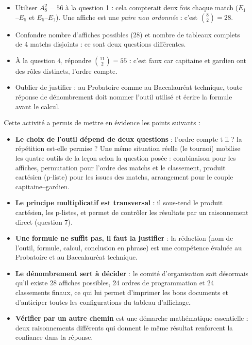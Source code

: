 \documentclass[11pt]{article}
\newcounter{popsec}
\newcounter{popsub}
\newcommand{\courssub}[1]{%
  \stepcounter{popsub}%
  \par\vspace{9pt}\noindent{\popxbold\fontsize{11.5}{13}\selectfont\color{popink}{\color{poporange}\thepopsec.\thepopsub}\hspace{6pt}#1}\par\nopagebreak\vspace{4pt}
}
\begin{document}
\begin{attention}
\begin{itemize}
\item Utiliser $A_8^2 = 56$ à la question 1 : cela compterait deux fois chaque match ($E_1$--$E_5$ et $E_5$--$E_1$). Une affiche est une \emph{paire non ordonnée} : c'est $\binom{8}{2} = 28$.
\item Confondre \og nombre d'affiches possibles \fg{} (28) et \og nombre de tableaux complets de 4 matchs disjoints \fg : ce sont deux questions différentes.
\item À la question 4, répondre $\binom{11}{2} = 55$ : c'est faux car capitaine et gardien ont des rôles distincts, l'ordre compte.
\item Oublier de justifier : au Probatoire comme au Baccalauréat technique, toute réponse de dénombrement doit nommer l'outil utilisé et écrire la formule avant le calcul.
\end{itemize}
\end{attention}

\courssub{Bilan de l'activité}

Cette activité a permis de mettre en évidence les points suivants :
\begin{itemize}
\item \textbf{Le choix de l'outil dépend de deux questions} : l'ordre compte-t-il ? la répétition est-elle permise ? Une même situation réelle (le tournoi) mobilise les quatre outils de la leçon selon la question posée : combinaison pour les affiches, permutation pour l'ordre des matchs et le classement, produit cartésien (p-liste) pour les issues des matchs, arrangement pour le couple capitaine--gardien.
\item \textbf{Le principe multiplicatif est transversal} : il sous-tend le produit cartésien, les p-listes, et permet de contrôler les résultats par un raisonnement direct (question 7).
\item \textbf{Une formule ne suffit pas, il faut la justifier} : la rédaction (nom de l'outil, formule, calcul, conclusion en phrase) est une compétence évaluée au Probatoire et au Baccalauréat technique.
\item \textbf{Le dénombrement sert à décider} : le comité d'organisation sait désormais qu'il existe 28 affiches possibles, 24 ordres de programmation et 24 classements finaux, ce qui lui permet d'imprimer les bons documents et d'anticiper toutes les configurations du tableau d'affichage.
\item \textbf{Vérifier par un autre chemin} est une démarche mathématique essentielle : deux raisonnements différents qui donnent le même résultat renforcent la confiance dans la réponse.
\end{itemize}
\end{document}
